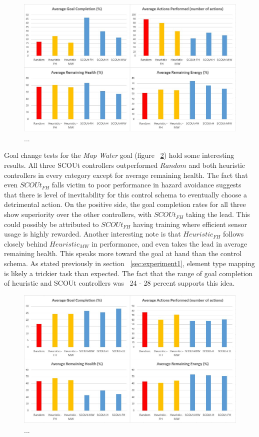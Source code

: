 \begin{figure}[H]
  \includegraphics[width=1.0\columnwidth]{Figures/Results/Experiment2/GoalChange/FindHumanGoal.JPG}
  \caption{...}
  \label{fig:goal_change_findhuman}
\end{figure}

Goal change tests for the \textit{Map Water} goal (figure ~\ref{fig:goal_change_mapwater}) hold some interesting results.
All three SCOUt controllers outperformed $Random$ and both heuristic controllers in every category except for average remaining health.
The fact that even $SCOUt_{FH}$ falls victim to poor performance in hazard avoidance suggests that there is level of inevitability for this control schema to eventually choose a detrimental action.
On the positive side, the goal completion rates for all three show superiority over the other controllers, with $SCOUt_{FH}$ taking the lead.
This could possibly be attributed to $SCOUt_{FH}$ having training where efficient sensor usage is highly rewarded.
Another interesting note is that $Heuristic_{FH}$ follows closely behind $Heuristic_{MW}$ in performance, and even takes the lead in average remaining health.
This speaks more toward the goal at hand than the control schema.
As stated previously in section ~\ref{sec:experiment1}, element type mapping is likely a trickier task than expected.
The fact that the range of goal completion of heuristic and SCOUt controllers was ~24 - 28 percent supports this idea.

\begin{figure}[H]
  \includegraphics[width=1.0\columnwidth]{Figures/Results/Experiment2/GoalChange/MapWaterGoal.JPG}
  \caption{...}
  \label{fig:goal_change_mapwater}
\end{figure}


